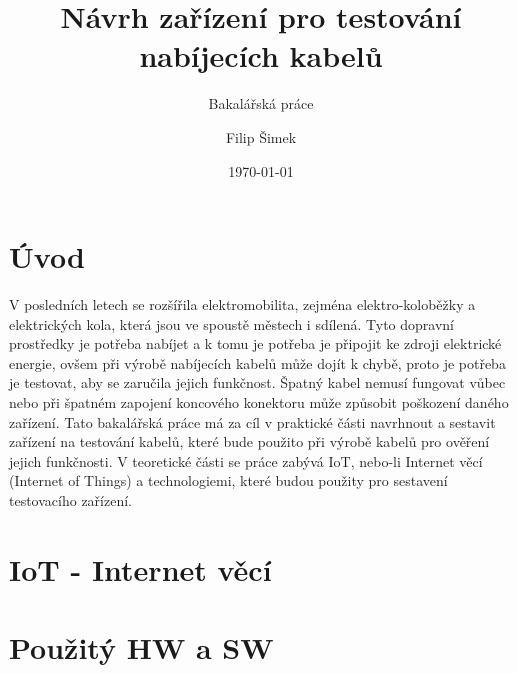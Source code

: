\documentclass[12pt,a4paper,titlepage]{scrreprt}
\title{\vspace{6cm}Návrh zařízení pro testování nabíjecích kabelů}
\subtitle{Bakalářská práce}
\author{Filip Šimek}
\date{\today}
\begin{document}
	
	
	
	\thispagestyle{empty}
	
	\thispagestyle{empty}
	
	\setcounter{page}{5}
	\newpage
	\thispagestyle{empty}
	
	
	\tableofcontents
	\thispagestyle{empty}
	
	\listoffigures
	\thispagestyle{empty}
	\listoftables
	\thispagestyle{empty}
	
	\chapter{Úvod}
	V posledních letech se rozšířila elektromobilita, zejména elektro-koloběžky a elektrických kola, která jsou ve spoustě městech i sdílená. Tyto dopravní prostředky je potřeba nabíjet a k tomu je potřeba je připojit ke zdroji elektrické energie, ovšem při výrobě nabíjecích kabelů může dojít k chybě, proto je potřeba je testovat, aby se zaručila jejich funkčnost. Špatný kabel nemusí fungovat vůbec nebo při špatném zapojení koncového konektoru může způsobit poškození daného zařízení. Tato bakalářská práce má za cíl v praktické části navrhnout a sestavit zařízení na testování kabelů, které bude použito při výrobě kabelů pro ověření jejich funkčnosti. V teoretické části se práce zabývá IoT, nebo-li Internet věcí (Internet of Things) a technologiemi, které budou použity pro sestavení testovacího zařízení.
	
	\chapter{IoT - Internet věcí}
	
	
	
	\chapter{Použitý HW a SW}
	
	\newpage
	
	\newpage
	
	
\end{document}
